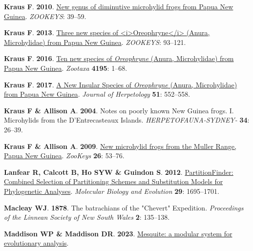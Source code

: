 \documentclass[
  letterpaper,
  DIV=11,
  numbers=noendperiod]{scrartcl}
\newlength{\cslhangindent}
\newenvironment{CSLReferences}[2] %
 {\begin{list}{}{%
  \setlength{\itemindent}{0pt}
  \setlength{\leftmargin}{0pt}
  \setlength{\parsep}{0pt}
  \ifodd #1
   \setlength{\leftmargin}{\cslhangindent}
   \setlength{\itemindent}{-1\cslhangindent}
  \fi
  \setlength{\itemsep}{#2\baselineskip}}}
 {\end{list}}
\begin{document}
\begin{CSLReferences}{0}{1}
\textbf{\textbf{Kraus F}}. \textbf{2010}.
\href{https://doi.org/10.3897/zookeys.48.446}{{New genus of diminutive
microhylid frogs from Papua New Guinea}}. \emph{ZOOKEYS}: 39--59.

\textbf{\textbf{Kraus F}}. \textbf{2013}.
\href{https://doi.org/10.3897/zookeys.330.5795}{{Three new species of
\textless i\textgreater Oreophryne\textless/i\textgreater{} (Anura,
Microhylidae) from Papua New Guinea}}. \emph{ZOOKEYS}: 93--121.

\textbf{\textbf{Kraus F}}. \textbf{2016}.
\href{https://doi.org/10.11646/zootaxa.4195.1.1}{{Ten new species of
\emph{Oreophryne} (Anura, Microhylidae) from Papua New Guinea}}.
\emph{Zootaxa} \textbf{4195}: 1--68.

\textbf{\textbf{Kraus F}}. \textbf{2017}.
\href{https://doi.org/10.1670/17-002}{{A New Insular Species of
\emph{Oreophryne} (Anura, Microhylidae) from Papua New Guinea}}.
\emph{Journal of Herpetology} \textbf{51}: 552--558.

\textbf{\textbf{Kraus F} \& \textbf{Allison A}}. \textbf{2004}. {Notes
on poorly known New Guinea frogs. I. Microhylids from the
D'Entrecasteaux Islands}. \emph{HERPETOFAUNA-SYDNEY-} \textbf{34}:
26--39.

\textbf{\textbf{Kraus F} \& \textbf{Allison A}}. \textbf{2009}.
\href{https://doi.org/10.3897/zookeys.26.258}{{New microhylid frogs from
the Muller Range, Papua New Guinea}}. \emph{ZooKeys} \textbf{26}:
53--76.

\textbf{\textbf{Lanfear R}, \textbf{Calcott B}, \textbf{Ho SYW} \&
\textbf{Guindon S}}. \textbf{2012}.
\href{https://doi.org/10.1093/molbev/mss020}{{PartitionFinder: Combined
Selection of Partitioning Schemes and Substitution Models for
Phylogenetic Analyses}}. \emph{Molecular Biology and Evolution}
\textbf{29}: 1695--1701.

\textbf{\textbf{Macleay WJ}}. \textbf{1878}. {The batrachians of the
"Chevert" Expedition}. \emph{Proceedings of the Linnean Society of New
South Wales} \textbf{2}: 135--138.

\textbf{\textbf{Maddison WP} \& \textbf{Maddison DR}}. \textbf{2023}.
\href{http://www.mesquiteproject.org}{{Mesquite: a modular system for
evolutionary analysis}}.


\end{CSLReferences}
\end{document}
